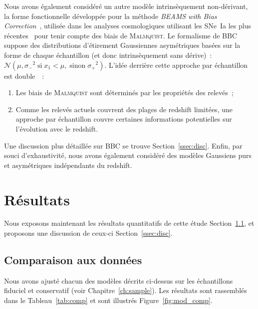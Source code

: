 \documentclass[../main/main.tex]{subfiles}
\begin{document}
Nous avons également considéré un autre modèle intrinsèquement non-dérivant, la
forme fonctionnelle développée pour la méthode \textit{BEAMS with Bias
Correction}~\citep[BBC,][]{scolnic2016, kessler2017}, utilisée dans les analyses
cosmologiques utilisant les SNe~Ia les plus récentes~\citep[par
exemple][]{scolnic2018, abbott2019, riess2016, riess2019} pour tenir compte des
biais de \textsc{Malmquist}. Le formalisme de BBC suppose des distributions
d'étirement Gaussiennes asymétriques basées sur la forme de chaque échantillon
(et donc intrinsèquement sans dérive)~: $\mathcal{N}\left(\mu, \sigma_-{}^2\;
\text{si} \;x_1<\mu,\; \text{sinon} \;\sigma_+{}^2\right)$. L'idée derrière
cette approche par échantillon est double~\citep{scolnic2016, scolnic2018}~:
\begin{enumerate}
    \item Les biais de \textsc{Malmquist} sont déterminés par les propriétés des
        relevés~;
    \item Comme les relevés actuels couvrent des plages de redshift limitées,
        une approche par échantillon couvre certaines informations potentielles
        sur l'évolution avec le redshift.
\end{enumerate}
Une discussion plus détaillée sur BBC se trouve Section~\ref{ssec:disc}. Enfin,
par souci d'exhaustivité, nous avons également considéré des modèles Gaussiens
purs et asymétriques indépendants du redshift.

\section{Résultats}\label{sec:xres}

Nous exposons maintenant les résultats quantitatifs de cette étude
Section~\ref{ssec:xcomp}, et proposons une discussion de ceux-ci
Section~\ref{ssec:disc}.

\subsection{Comparaison aux données}\label{ssec:xcomp}
Nous avons ajusté chacun des modèles décrits ci-dessus sur les échantillons
fiduciel et conservatif (voir Chapitre~\ref{ch:sample}). Les résultats sont
rassemblés dans le Tableau~\ref{tab:comp} et sont illustrés
Figure~\ref{fig:mod_comp}.
\end{document}
